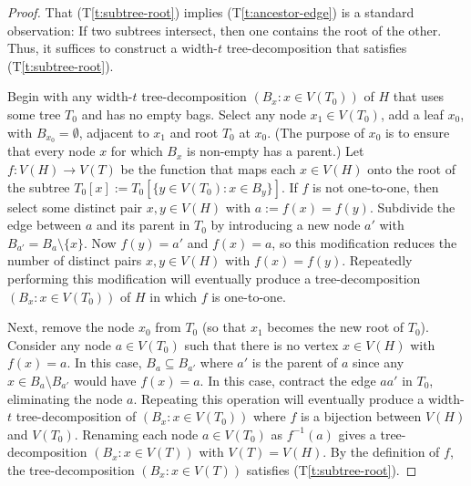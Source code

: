 \documentclass{patmorin}
\theoremstyle{plain}
\theoremstyle{definition}
\newcommand{\note}[2]{\noindent{\color{red}[#1:~#2]}}
\newcommand{\referee}[2]{\noindent\textcolor{blue}{\framebox{\begin{minipage}{\textwidth} Ref \#{#1}: #2\end{minipage}}}}
\newcommand{\tref}[1]{(T\ref{t:#1})}
\begin{document}
\begin{proof}
  That \tref{subtree-root} implies \tref{ancestor-edge} is a standard observation: If two subtrees intersect, then one contains the root of the other.  Thus, it suffices to construct a width-$t$ tree-decomposition that satisfies \tref{subtree-root}.

  Begin with any width-$t$ tree-decomposition $(B_x:x\in V(T_0))$ of $H$ that uses some tree $T_0$ and has no empty bags.  Select any node $x_1\in V(T_0)$, add a leaf $x_0$, with $B_{x_0}=\emptyset$, adjacent to $x_1$ and root $T_0$ at $x_0$. (The purpose of $x_0$ is to ensure that every node $x$ for which $B_x$ is non-empty has a parent.)  Let $f:V(H)\to V(T)$ be the function that maps each $x\in V(H)$ onto the root of the subtree $T_0[x]:=T_0[\{y\in V(T_0): x\in B_y\}]$.  If $f$ is not one-to-one, then select some distinct pair $x,y\in V(H)$ with $a:=f(x)=f(y)$.  Subdivide the edge between $a$ and its parent in $T_0$ by introducing a new node $a'$ with $B_{a'}=B_{a}\setminus\{x\}$. Now $f(y)=a'$ and $f(x)=a$, so this modification reduces the number of distinct pairs $x,y\in V(H)$ with $f(x)=f(y)$.  Repeatedly performing this modification will eventually produce a tree-decomposition $(B_x:x\in V(T_0))$ of $H$ in which $f$ is one-to-one.

  Next, remove the node $x_0$ from $T_0$ (so that $x_1$ becomes the new root of $T_0$).  Consider any node $a\in V(T_0)$ such that there is no vertex $x\in V(H)$ with $f(x)=a$.  In this case, $B_{a}\subseteq B_{a'}$ where $a'$ is the parent of $a$ since any $x\in B_a\setminus B_{a'}$ would have $f(x)=a$.  In this case, contract the edge $aa'$ in $T_0$, eliminating the node $a$.  Repeating this operation will eventually produce a width-$t$ tree-decomposition of $(B_x:x\in V(T_0))$ where $f$ is a bijection between $V(H)$ and $V(T_0)$.  Renaming each node $a\in V(T_0)$ as $f^{-1}(a)$ gives a tree-decomposition $(B_x:x\in V(T))$ with $V(T)=V(H)$.  By the definition of $f$, the tree-decomposition $(B_x:x\in V(T))$ satisfies \tref{subtree-root}.
\end{proof}


%
%
\end{document}
